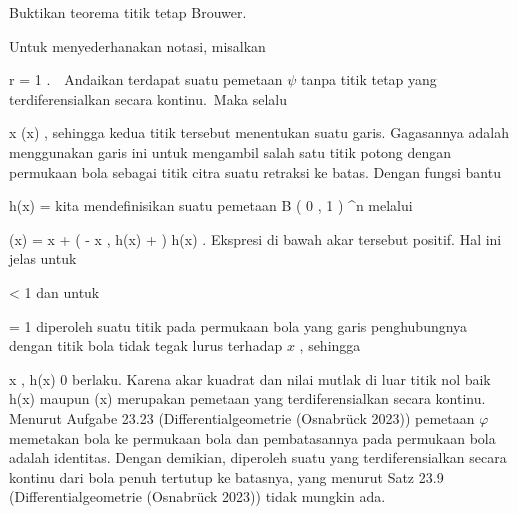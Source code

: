 {

Buktikan teorema titik tetap Brouwer.

}
{

Untuk menyederhanakan notasi, misalkan

\mavergleichskette
{\vergleichskette
{ r
}
{ = }{ 1
}
{  }{
}
{    }{
}
{   }{
}
}
{}{}{.}  Andaikan terdapat suatu pemetaan $\psi$ tanpa titik tetap yang terdiferensialkan secara kontinu. Maka selalu

\mavergleichskettedisp
{\vergleichskette
{ x
}
{ \neq} { \psi(x)
}
{ } {
}
{ } {
}
{ } {
}
}
{}{}{,}
sehingga kedua titik tersebut menentukan suatu garis. Gagasannya adalah menggunakan garis ini untuk mengambil salah satu
 {} {}
titik potong dengan permukaan bola sebagai titik citra suatu retraksi ke batas. Dengan fungsi bantu

\mavergleichskettedisp
{\vergleichskette
{ h(x)
}
{ =} { {  }
}
{ } {
}
{ } {
}
{ } {
}
}
{}{}{}
kita mendefinisikan suatu pemetaan
\maabbdisp {\varphi} { B  \left(  0 , 1 \right) } { \R^n
} {}
melalui

\mavergleichskettedisphandlinks
{\vergleichskettedisphandlinks
{ \varphi(x)
}
{ =} { x + \left(  - \left\langle  x  , h(x)  \right\rangle +   \right) \cdot h(x)
}
{ } {
}
{ } {
}
{ } {
}
}
{}{}{.}
Ekspresi di bawah akar tersebut positif. Hal ini jelas untuk

\mavergleichskette
{\vergleichskette
{  \Vert
}
{ < }{ 1
}
{  }{
}
{    }{
}
{   }{
}
}
{}{}{}
dan untuk

\mavergleichskette
{\vergleichskette
{  \Vert
}
{ = }{ 1
}
{  }{
}
{    }{
}
{   }{
}
}
{}{}{}
diperoleh suatu titik pada permukaan bola yang garis penghubungnya dengan titik bola
 tidak tegak lurus terhadap $x$
 {} {,}
sehingga

\mavergleichskettedisp
{\vergleichskette
{ \left\langle  x  , h(x)  \right\rangle
}
{ \neq} { 0
}
{ } {
}
{ } {
}
{ } {
}
}
{}{}{}
berlaku. Karena akar kuadrat dan nilai mutlak di luar titik nol
baik
\mathkor {} {h(x)} {maupun} {\varphi(x)} {}
merupakan pemetaan yang terdiferensialkan secara kontinu. Menurut
Aufgabe 23.23 (Differentialgeometrie (Osnabrück 2023))
pemetaan $\varphi$ memetakan bola ke permukaan bola dan pembatasannya pada permukaan bola adalah identitas. Dengan demikian, diperoleh suatu
yang terdiferensialkan secara kontinu dari bola penuh tertutup ke batasnya, yang menurut
Satz 23.9 (Differentialgeometrie (Osnabrück 2023))
tidak mungkin ada.

 }



